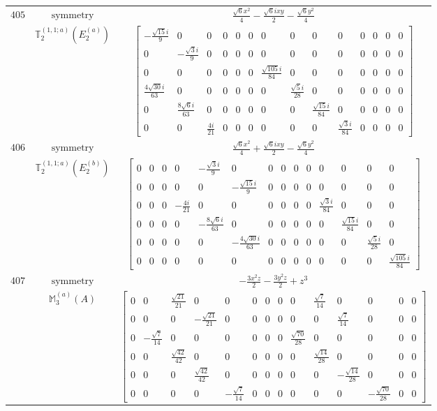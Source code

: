 \documentclass[fleqn,8pt,landscape]{jsarticle}
\begin{document}
\begin{longtable}{ccc}
$ 405 $ & $ \text{symmetry} $ & $ \frac{\sqrt{6} x^{2}}{4} - \frac{\sqrt{6} i x y}{2} - \frac{\sqrt{6} y^{2}}{4} $ \\
$  $ & $ \mathbb{T}_{2}^{(1,1;a)}(E_{2}^{(a)}) $ & $ \begin{bmatrix} - \frac{\sqrt{15} i}{9} & 0 & 0 & 0 & 0 & 0 & 0 & 0 & 0 & 0 & 0 & 0 & 0 & 0 \\ 0 & - \frac{\sqrt{3} i}{9} & 0 & 0 & 0 & 0 & 0 & 0 & 0 & 0 & 0 & 0 & 0 & 0 \\ 0 & 0 & 0 & 0 & 0 & 0 & \frac{\sqrt{105} i}{84} & 0 & 0 & 0 & 0 & 0 & 0 & 0 \\ \frac{4 \sqrt{30} i}{63} & 0 & 0 & 0 & 0 & 0 & 0 & \frac{\sqrt{5} i}{28} & 0 & 0 & 0 & 0 & 0 & 0 \\ 0 & \frac{8 \sqrt{6} i}{63} & 0 & 0 & 0 & 0 & 0 & 0 & \frac{\sqrt{15} i}{84} & 0 & 0 & 0 & 0 & 0 \\ 0 & 0 & \frac{4 i}{21} & 0 & 0 & 0 & 0 & 0 & 0 & \frac{\sqrt{3} i}{84} & 0 & 0 & 0 & 0 \end{bmatrix} $ \\ \hline
$ 406 $ & $ \text{symmetry} $ & $ \frac{\sqrt{6} x^{2}}{4} + \frac{\sqrt{6} i x y}{2} - \frac{\sqrt{6} y^{2}}{4} $ \\
$  $ & $ \mathbb{T}_{2}^{(1,1;a)}(E_{2}^{(b)}) $ & $ \begin{bmatrix} 0 & 0 & 0 & 0 & - \frac{\sqrt{3} i}{9} & 0 & 0 & 0 & 0 & 0 & 0 & 0 & 0 & 0 \\ 0 & 0 & 0 & 0 & 0 & - \frac{\sqrt{15} i}{9} & 0 & 0 & 0 & 0 & 0 & 0 & 0 & 0 \\ 0 & 0 & 0 & - \frac{4 i}{21} & 0 & 0 & 0 & 0 & 0 & 0 & \frac{\sqrt{3} i}{84} & 0 & 0 & 0 \\ 0 & 0 & 0 & 0 & - \frac{8 \sqrt{6} i}{63} & 0 & 0 & 0 & 0 & 0 & 0 & \frac{\sqrt{15} i}{84} & 0 & 0 \\ 0 & 0 & 0 & 0 & 0 & - \frac{4 \sqrt{30} i}{63} & 0 & 0 & 0 & 0 & 0 & 0 & \frac{\sqrt{5} i}{28} & 0 \\ 0 & 0 & 0 & 0 & 0 & 0 & 0 & 0 & 0 & 0 & 0 & 0 & 0 & \frac{\sqrt{105} i}{84} \end{bmatrix} $ \\ \hline
$ 407 $ & $ \text{symmetry} $ & $ - \frac{3 x^{2} z}{2} - \frac{3 y^{2} z}{2} + z^{3} $ \\
$  $ & $ \mathbb{M}_{3}^{(a)}(A) $ & $ \begin{bmatrix} 0 & 0 & \frac{\sqrt{21}}{21} & 0 & 0 & 0 & 0 & 0 & 0 & \frac{\sqrt{7}}{14} & 0 & 0 & 0 & 0 \\ 0 & 0 & 0 & - \frac{\sqrt{21}}{21} & 0 & 0 & 0 & 0 & 0 & 0 & \frac{\sqrt{7}}{14} & 0 & 0 & 0 \\ 0 & - \frac{\sqrt{7}}{14} & 0 & 0 & 0 & 0 & 0 & 0 & \frac{\sqrt{70}}{28} & 0 & 0 & 0 & 0 & 0 \\ 0 & 0 & \frac{\sqrt{42}}{42} & 0 & 0 & 0 & 0 & 0 & 0 & \frac{\sqrt{14}}{28} & 0 & 0 & 0 & 0 \\ 0 & 0 & 0 & \frac{\sqrt{42}}{42} & 0 & 0 & 0 & 0 & 0 & 0 & - \frac{\sqrt{14}}{28} & 0 & 0 & 0 \\ 0 & 0 & 0 & 0 & - \frac{\sqrt{7}}{14} & 0 & 0 & 0 & 0 & 0 & 0 & - \frac{\sqrt{70}}{28} & 0 & 0 \end{bmatrix} $ \\ \hline

\end{longtable}
\end{document}
